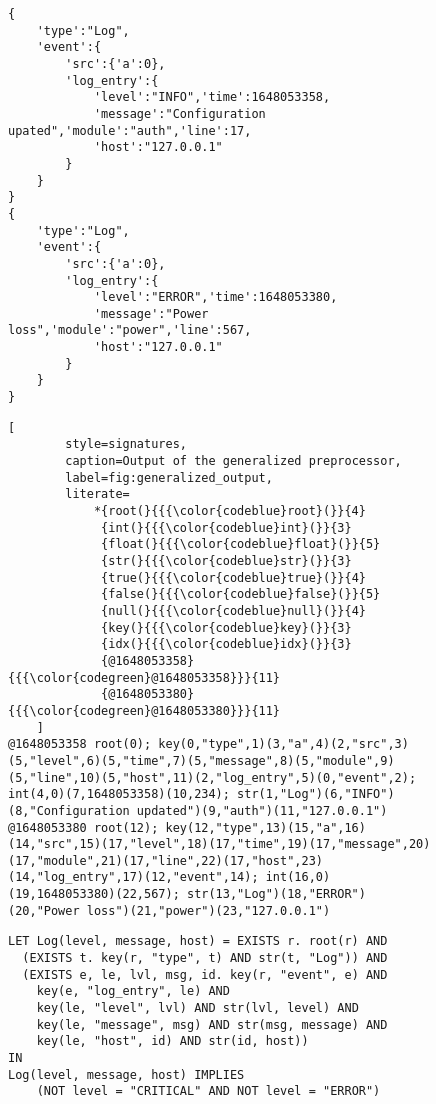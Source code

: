 \begin{figure}[p]
	\begin{lstlisting}[style=json,caption=Input JSON log,label=fig:generalized_json_log]
{
	'type':"Log",
	'event':{
		'src':{'a':0},
		'log_entry':{
			'level':"INFO",'time':1648053358,
			'message':"Configuration upated",'module':"auth",'line':17,
			'host':"127.0.0.1"
		}
	}
}
{
	'type':"Log",
	'event':{
		'src':{'a':0},
		'log_entry':{
			'level':"ERROR",'time':1648053380,
			'message':"Power loss",'module':"power",'line':567,
			'host':"127.0.0.1"
		}
	}
}\end{lstlisting}
\end{figure}

\begin{figure}[p]
	\begin{lstlisting}[
		style=signatures,
		caption=Output of the generalized preprocessor,
		label=fig:generalized_output,
		literate=
			*{root(}{{{\color{codeblue}root}(}}{4}
			 {int(}{{{\color{codeblue}int}(}}{3}
			 {float(}{{{\color{codeblue}float}(}}{5}
			 {str(}{{{\color{codeblue}str}(}}{3}
			 {true(}{{{\color{codeblue}true}(}}{4}
			 {false(}{{{\color{codeblue}false}(}}{5}
			 {null(}{{{\color{codeblue}null}(}}{4}
			 {key(}{{{\color{codeblue}key}(}}{3}
			 {idx(}{{{\color{codeblue}idx}(}}{3}
			 {@1648053358}{{{\color{codegreen}@1648053358}}}{11}
			 {@1648053380}{{{\color{codegreen}@1648053380}}}{11}
	]
@1648053358 root(0); key(0,"type",1)(3,"a",4)(2,"src",3)(5,"level",6)(5,"time",7)(5,"message",8)(5,"module",9)(5,"line",10)(5,"host",11)(2,"log_entry",5)(0,"event",2); int(4,0)(7,1648053358)(10,234); str(1,"Log")(6,"INFO")(8,"Configuration updated")(9,"auth")(11,"127.0.0.1")
@1648053380 root(12); key(12,"type",13)(15,"a",16)(14,"src",15)(17,"level",18)(17,"time",19)(17,"message",20)(17,"module",21)(17,"line",22)(17,"host",23)(14,"log_entry",17)(12,"event",14); int(16,0)(19,1648053380)(22,567); str(13,"Log")(18,"ERROR")(20,"Power loss")(21,"power")(23,"127.0.0.1")\end{lstlisting}
\end{figure}

\begin{figure}[p]
	\begin{lstlisting}[style=formula,caption=MFODL formula,label=fig:generalized_formula]
LET Log(level, message, host) = EXISTS r. root(r) AND
  (EXISTS t. key(r, "type", t) AND str(t, "Log")) AND
  (EXISTS e, le, lvl, msg, id. key(r, "event", e) AND
    key(e, "log_entry", le) AND
    key(le, "level", lvl) AND str(lvl, level) AND
    key(le, "message", msg) AND str(msg, message) AND
    key(le, "host", id) AND str(id, host))
IN
Log(level, message, host) IMPLIES
	(NOT level = "CRITICAL" AND NOT level = "ERROR")
	\end{lstlisting}\end{figure}


